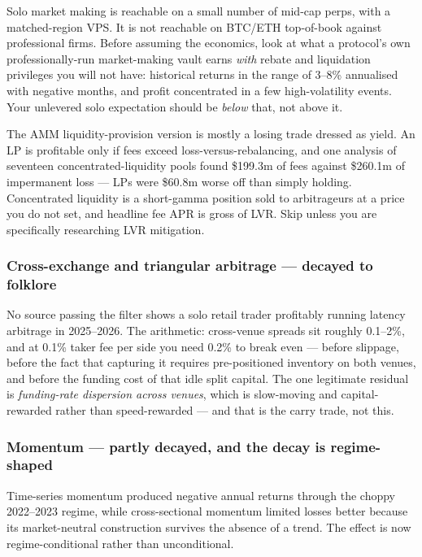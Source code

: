 \documentclass[11pt,a4paper]{article}
\begin{document}
Solo market making is reachable on a small number of mid-cap perps, with a
matched-region VPS. It is not reachable on BTC/ETH top-of-book against
professional firms. Before assuming the economics, look at what a protocol's own
professionally-run market-making vault earns \emph{with} rebate and liquidation
privileges you will not have: historical returns in the range of 3--8\% annualised
with negative months, and profit concentrated in a few high-volatility events.
Your unlevered solo expectation should be \emph{below} that, not above it.

\begin{waste}
The AMM liquidity-provision version is mostly a losing trade dressed as yield. An
LP is profitable only if fees exceed loss-versus-rebalancing, and one analysis of
seventeen concentrated-liquidity pools found \$199.3m of fees against \$260.1m of
impermanent loss --- LPs were \$60.8m worse off than simply holding. Concentrated
liquidity is a short-gamma position sold to arbitrageurs at a price you do not
set, and headline fee APR is gross of LVR. Skip unless you are specifically
researching LVR mitigation.
\end{waste}

\subsubsection{Cross-exchange and triangular arbitrage --- decayed to folklore}

No source passing the filter shows a solo retail trader profitably running latency
arbitrage in 2025--2026. The arithmetic: cross-venue spreads sit roughly
0.1--2\%, and at 0.1\% taker fee per side you need 0.2\% to break even --- before
slippage, before the fact that capturing it requires pre-positioned inventory on
both venues, and before the funding cost of that idle split capital. The one
legitimate residual is \emph{funding-rate dispersion across venues}, which is
slow-moving and capital-rewarded rather than speed-rewarded --- and that is the
carry trade, not this.

\subsubsection{Momentum --- partly decayed, and the decay is regime-shaped}

Time-series momentum produced negative annual returns through the choppy
2022--2023 regime, while cross-sectional momentum limited losses better because
its market-neutral construction survives the absence of a trend. The effect is now
regime-conditional rather than unconditional.
\end{document}

